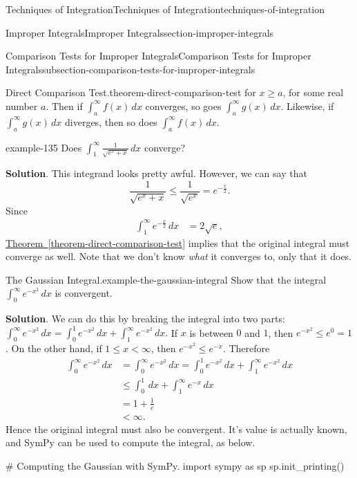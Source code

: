 \documentclass[oneside,10pt,]{book}
\numberwithin{equation}{section}
\newcommand{\lt}{<}
\begin{document}
\begin{chapterptx}{Techniques of Integration}{}{Techniques of Integration}{}{}{techniques-of-integration}
\begin{sectionptx}{Improper Integrals}{}{Improper Integrals}{}{}{section-improper-integrals}
\begin{subsectionptx}{Comparison Tests for Improper Integrals}{}{Comparison Tests for Improper Integrals}{}{}{subsection-comparison-tests-for-improper-integrals}
\begin{theorem}{Direct Comparison Test.}{}{theorem-direct-comparison-test}
for \(x\geq a\), for some real number \(a\). Then if \(\int_{a}^{\infty}f(x)\,dx\) converges, so goes \(\int_{a}^{\infty}g(x)\,dx\). Likewise, if \(\int_{a}^{\infty}g(x)\,dx\) diverges, then so does \(\int_{a}^{\infty}f(x)\,dx\).%
\end{theorem}
\begin{example}{}{example-135}%
\hypertarget{p-604}{}%
Does \(\int_{1}^{\infty}\frac{1}{\sqrt{e^{x} + x}}\,dx\) converge?%
\par\smallskip%
\noindent\textbf{Solution}.\hypertarget{solution-131}{}\quad%
\hypertarget{p-605}{}%
This integrand looks pretty awful. However, we can say that%
\begin{equation*}
\frac{1}{\sqrt{e^{x} + x}} \leq \frac{1}{\sqrt{e^{x}}} = e^{-\frac{x}{2}}.
\end{equation*}
Since%
\begin{align*}
\int_{1}^{\infty}e^{-\frac{x}{2}}\,dx & = 2\sqrt{e}, 
\end{align*}
\hyperref[theorem-direct-comparison-test]{Theorem~\ref{theorem-direct-comparison-test}} implies that the original integral must converge as well. Note that we don't know \emph{what} it converges to, only that it does.%
\end{example}
\begin{example}{The Gaussian Integral.}{example-the-gaussian-integral}%
\hypertarget{p-606}{}%
Show that the integral \(\int_{0}^{\infty}e^{-x^{2}}\,dx\) is convergent.%
\par\smallskip%
\noindent\textbf{Solution}.\hypertarget{solution-132}{}\quad%
\hypertarget{p-607}{}%
We can do this by breaking the integral into two parts: \(\int_{0}^{\infty}e^{-x^{2}}\,dx = \int_{0}^{1}e^{-x^{2}}\,dx + \int_{1}^{\infty}e^{-x^{2}}\,dx.\) If \(x\) is between \(0\) and \(1\), then \(e^{-x^{2}} \leq e^{0} = 1\). On the other hand, if \(1\leq x\lt \infty\), then \(e^{-x^{2}} \leq e^{-x}\). Therefore%
\begin{align*}
\int_{0}^{\infty}e^{-x^{2}}\,dx & = \int_{0}^{\infty}e^{-x^{2}}\,dx = \int_{0}^{1}e^{-x^{2}}\,dx + \int_{1}^{\infty}e^{-x^{2}}\,dx\\
& \leq \int_{0}^{1}\,dx + \int_{1}^{\infty}e^{-x}\,dx \\
& = 1 + \frac{1}{e} \\
& \lt \infty.
\end{align*}
Hence the original integral must also be convergent. It's value is actually known, and SymPy can be used to compute the integral, as below.%
\end{example}
\begin{sageinput}
# Computing the Gaussian with SymPy.
import sympy as sp
sp.init_printing()


\end{sageinput}
\end{subsectionptx}
\end{sectionptx}
\end{chapterptx}
\end{document}
